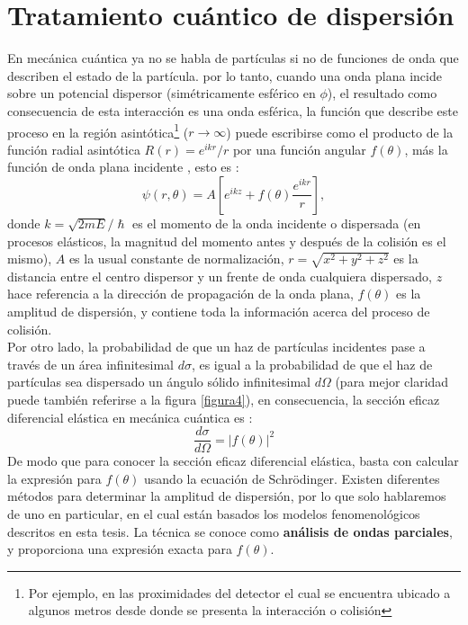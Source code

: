 \section{Tratamiento cu\'antico de dispersi\'on}\label{seccion2_2}
En mec\'anica cu\'antica ya no se habla de part\'iculas si no de funciones de onda que describen el estado de la part\'icula. por lo tanto, cuando una onda plana incide sobre un potencial dispersor (sim\'etricamente esf\'erico en $\phi$),  el resultado como consecuencia de esta interacci\'on es una onda esf\'erica, la funci\'on que describe este proceso en la regi\'on asint\'otica\footnote{Por ejemplo, en las proximidades del detector el cual se encuentra ubicado a algunos metros desde donde se presenta la interacci\'on o colisi\'on} ($r\rightarrow \infty$) puede escribirse como el producto de la funci\'on radial asint\'otica $R(r)=e^{ikr}/r$ por una funci\'on angular $f(\theta)$, m\'as la funci\'on de onda plana incidente \cite{griphys,varone}, esto es :
\begin{equation}
\psi(r,\theta)=A \left[ e^{ikz}+f(\theta)\frac{e^{ikr}}{r}\right],
\end{equation}
donde $k=\sqrt{2mE}/\hslash$ es el momento de la onda incidente o dispersada (en procesos el\'asticos, la magnitud del momento antes y despu\'es de la colisi\'on es el mismo), $A$ es la usual constante de normalizaci\'on, $r=\sqrt{x^2+y^2+z^2}$ es la distancia entre el centro dispersor y un frente de onda cualquiera dispersado, $z$ hace referencia a la direcci\'on de propagaci\'on de la onda plana, $f(\theta)$ es la amplitud de dispersi\'on, y contiene toda la informaci\'on acerca del proceso de colisi\'on.\\

\sp Por otro lado, la probabilidad de que  un haz de part\'iculas incidentes pase a trav\'es de un \'area infinitesimal $d\sigma$, es igual a la probabilidad de que el haz de part\'iculas sea dispersado un \'angulo s\'olido infinitesimal $d\Omega$ (para mejor claridad  puede tambi\'en referirse a la figura \ref{figura4}), en consecuencia, 
la secci\'on eficaz diferencial el\'astica en mec\'anica cu\'antica es \cite{griphys}:
\begin{equation}\label{ecu2_6}
\frac{d\sigma}{d\Omega}=\left.|f(\theta)\right.|^2
\end{equation}
 De modo que para conocer la secci\'on eficaz diferencial el\'astica, basta con calcular la expresi\'on para $f(\theta)$ usando la ecuaci\'on de Schr\"odinger. Existen diferentes m\'etodos para determinar la amplitud de dispersi\'on, por lo que solo hablaremos de uno en particular, en el cual est\'an basados los modelos fenomenol\'ogicos descritos en esta tesis. La t\'ecnica se conoce como {\bf an\'alisis de ondas parciales}, y proporciona una expresi\'on exacta para $f(\theta)$.

